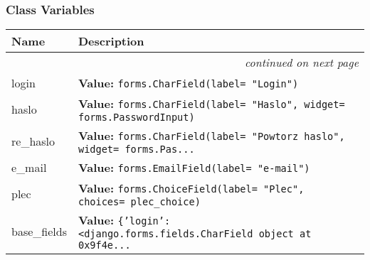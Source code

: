   \subsubsection{Class Variables}

    \vspace{-1cm}
\hspace{\varindent}\begin{longtable}{|p{\varnamewidth}|p{\vardescrwidth}|l}
\cline{1-2}
\cline{1-2} \centering \textbf{Name} & \centering \textbf{Description}& \\
\cline{1-2}
\endhead\cline{1-2}\multicolumn{3}{r}{\small\textit{continued on next page}}\\\endfoot\cline{1-2}
\endlastfoot\raggedright l\-o\-g\-i\-n\- & \raggedright \textbf{Value:} 
{\tt forms.CharField(label= "Login")}&\\
\cline{1-2}
\raggedright h\-a\-s\-l\-o\- & \raggedright \textbf{Value:} 
{\tt forms.CharField(label= "Haslo", widget= forms.PasswordInput)}&\\
\cline{1-2}
\raggedright r\-e\-\_\-h\-a\-s\-l\-o\- & \raggedright \textbf{Value:} 
{\tt forms.CharField(label= "Powtorz haslo", widget= forms.Pas\texttt{...}}&\\
\cline{1-2}
\raggedright e\-\_\-m\-a\-i\-l\- & \raggedright \textbf{Value:} 
{\tt forms.EmailField(label= "e-mail")}&\\
\cline{1-2}
\raggedright p\-l\-e\-c\- & \raggedright \textbf{Value:} 
{\tt forms.ChoiceField(label= "Plec", choices= plec\_choice)}&\\
\cline{1-2}
\raggedright b\-a\-s\-e\-\_\-f\-i\-e\-l\-d\-s\- & \raggedright \textbf{Value:} 
{\tt \{'login': {\textless}django.forms.fields.CharField object at 0x9f4e\texttt{...}}&\\
\cline{1-2}
\end{longtable}



